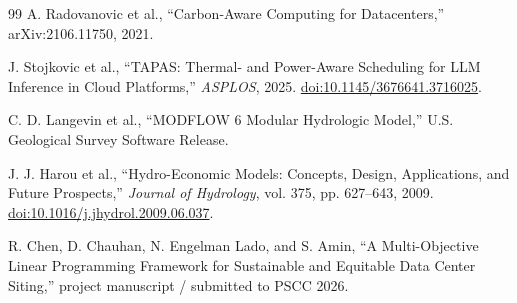 \documentclass[11pt]{article}
\begin{document}
\begin{thebibliography}{99}
A. Radovanovic et al.,
``Carbon-Aware Computing for Datacenters,''
arXiv:2106.11750, 2021.

J. Stojkovic et al.,
``TAPAS: Thermal- and Power-Aware Scheduling for LLM Inference in Cloud Platforms,''
\emph{ASPLOS}, 2025.
\href{https://doi.org/10.1145/3676641.3716025}{doi:10.1145/3676641.3716025}.

C. D. Langevin et al.,
``MODFLOW 6 Modular Hydrologic Model,''
U.S. Geological Survey Software Release.

J. J. Harou et al.,
``Hydro-Economic Models: Concepts, Design, Applications, and Future Prospects,''
\emph{Journal of Hydrology}, vol. 375, pp. 627--643, 2009.
\href{https://doi.org/10.1016/j.jhydrol.2009.06.037}{doi:10.1016/j.jhydrol.2009.06.037}.

R. Chen, D. Chauhan, N. Engelman Lado, and S. Amin,
``A Multi-Objective Linear Programming Framework for Sustainable and Equitable Data Center Siting,''
project manuscript / submitted to PSCC 2026.

\end{thebibliography}
\end{document}
